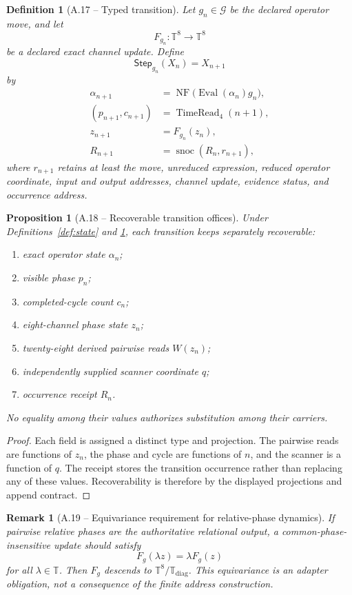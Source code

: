 \documentclass[11pt,letterpaper]{article}
\theoremstyle{relationstyle}
\newtheorem{proposition}[theorem]{Proposition}
\newtheorem{definition}[theorem]{Definition}
\newtheorem{remark}[theorem]{Remark}
\newcommand{\T}{\mathbb{T}}
\newcommand{\NF}{\operatorname{NF}}
\newcommand{\Eval}{\operatorname{Eval}}
\newcommand{\TimeRead}{\operatorname{TimeRead}_4}
\newcommand{\Step}{\mathsf{Step}}
\newcommand{\snoc}{\operatorname{snoc}}
\newcommand{\diagT}{\T_{\mathrm{diag}}}
\begin{document}
\begin{definition}[A.17 -- Typed transition]\label{def:transition}
Let $g_n\in\mathcal G$ be the declared operator move, and let
\[
F_{g_n}:\T^8\longrightarrow\T^8
\]
be a declared exact channel update.  Define
\[
\Step_{g_n}(X_n)=X_{n+1}
\]
by
\begin{align*}
\alpha_{n+1}&=\NF\bigl(\Eval(\alpha_n)g_n\bigr),\\
(p_{n+1},c_{n+1})&=\TimeRead(n+1),\\
z_{n+1}&=F_{g_n}(z_n),\\
R_{n+1}&=\snoc(R_n,r_{n+1}),
\end{align*}
where $r_{n+1}$ retains at least the move, unreduced expression, reduced operator coordinate, input and output addresses, channel update, evidence status, and occurrence address.
\end{definition}

\begin{proposition}[A.18 -- Recoverable transition offices]\label{prop:state}
Under Definitions~\ref{def:state} and \ref{def:transition}, each transition keeps separately recoverable:
\begin{enumerate}
  \item exact operator state $\alpha_n$;
  \item visible phase $p_n$;
  \item completed-cycle count $c_n$;
  \item eight-channel phase state $z_n$;
  \item twenty-eight derived pairwise reads $W(z_n)$;
  \item independently supplied scanner coordinate $q$;
  \item occurrence receipt $R_n$.
\end{enumerate}
No equality among their values authorizes substitution among their carriers.
\end{proposition}

\begin{proof}
Each field is assigned a distinct type and projection.  The pairwise reads are functions of $z_n$, the phase and cycle are functions of $n$, and the scanner is a function of $q$.  The receipt stores the transition occurrence rather than replacing any of these values.  Recoverability is therefore by the displayed projections and append contract.
\end{proof}

\begin{remark}[A.19 -- Equivariance requirement for relative-phase dynamics]
If pairwise relative phases are the authoritative relational output, a common-phase-insensitive update should satisfy
\[
F_g(\lambda z)=\lambda F_g(z)
\]
for all $\lambda\in\T$.  Then $F_g$ descends to $\T^8/\diagT$.  This equivariance is an adapter obligation, not a consequence of the finite address construction.
\end{remark}
\end{document}
